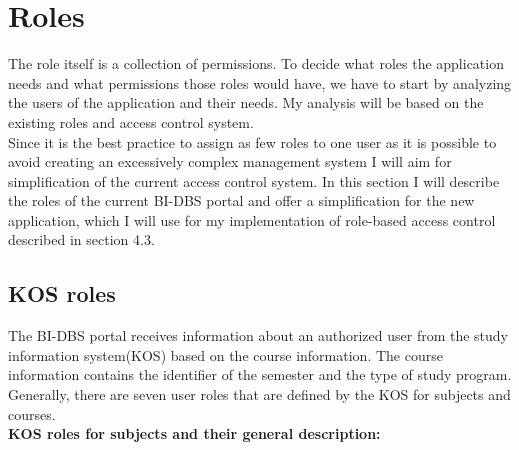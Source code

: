 \section{Roles} The role itself is a collection of permissions. To decide what roles the application needs and what permissions those roles would have, we have to start by analyzing the users of the application and their needs. My analysis will be based on the existing roles and access control system.\\
Since it is the best practice to assign as few roles to one user as it is possible \cite{role-auth} to avoid creating an excessively complex management system I will aim for simplification of the current access control system. In this section I will describe the roles of the current BI-DBS portal and offer a simplification for the new application, which I will use for my implementation of role-based access control described in section 4.3.

\subsection{KOS roles}
The BI-DBS portal receives information about an authorized user from the study information system(KOS) based on the course information. The course information contains the identifier of the semester and the type of study program. Generally, there are seven user roles that are defined by the KOS for subjects and courses.\cite{kosapi}\\

\noindent \textbf{KOS roles for subjects and their general description:\cite{kosroles}}

